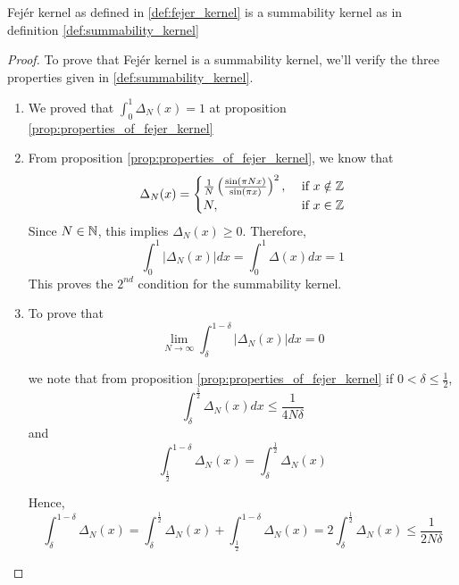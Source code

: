   \begin{proposition}
    \label{prop:fejer_kernel_is_summability_kernel}
    Fej\'er kernel as defined in \ref{def:fejer_kernel} is a summability kernel as in definition \ref{def:summability_kernel}
  \end{proposition}
  \begin{proof}
    To prove that Fej\'er kernel is a summability kernel, we'll verify the three properties given in \ref{def:summability_kernel}.
    \begin{enumerate}
      \item
        We proved that $\int_0^1 \Delta_N(x) = 1$ at proposition \ref{prop:properties_of_fejer_kernel}
      \item
        From proposition \ref{prop:properties_of_fejer_kernel}, we know that
        \begin{displaymath}
          \Delta_N(x) = 
          \begin{cases}
            \frac{1}{N} \left(\frac{\sin(\pi Nx)}{\sin(\pi x)}\right)^2, &\text{ if } x \notin \mathbb Z \\
            N, &\text{ if } x \in \mathbb Z \\
          \end{cases}
        \end{displaymath}
        Since $N \in \mathbb N$, this implies $\Delta_N(x) \ge 0$. Therefore,
        \begin{displaymath}
          \int_0^1 \left|\Delta_N(x)\right| dx = \int_0^1 \Delta(x) dx = 1
        \end{displaymath}
        This proves the $2^{nd}$ condition for the summability kernel.
        
      \item
        To prove that 
        \begin{displaymath}
          \lim_{N \to \infty}\int_\delta^{1-\delta} \left|\Delta_N(x) \right| dx = 0
        \end{displaymath}

        we note that from proposition \ref{prop:properties_of_fejer_kernel} if $0< \delta \le \frac{1}{2}$, $$ \int_\delta^{\frac{1}{2}}\Delta_N(x) dx \le \frac{1}{4N\delta}$$
        and 
        $$\int_\frac{1}{2}^{1-\delta} \Delta_N(x) =  \int_\delta^\frac{1}{2} \Delta_N(x)$$

        Hence,
        \begin{displaymath}
          \int_\delta^{1-\delta} \Delta_N(x) = \int_\delta^\frac{1}{2} \Delta_N(x) + \int_\frac{1}{2}^{1-\delta} \Delta_N(x) = 2 \int_\delta^\frac{1}{2} \Delta_N(x) \le \frac{1}{2N\delta}
        \end{displaymath}
       

\end{enumerate}
\end{proof}
